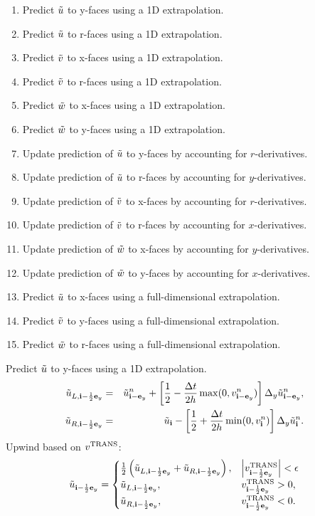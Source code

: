 \begin{enumerate}
\item Predict $\tilde{u}$ to y-faces using a 1D extrapolation.
\item Predict $\tilde{u}$ to r-faces using a 1D extrapolation.
\item Predict $\tilde{v}$ to x-faces using a 1D extrapolation.
\item Predict $\tilde{v}$ to r-faces using a 1D extrapolation.
\item Predict $\tilde{w}$ to x-faces using a 1D extrapolation.
\item Predict $\tilde{w}$ to y-faces using a 1D extrapolation.
\item Update prediction of $\tilde{u}$ to y-faces by accounting for $r$-derivatives.
\item Update prediction of $\tilde{u}$ to r-faces by accounting for $y$-derivatives.
\item Update prediction of $\tilde{v}$ to x-faces by accounting for $r$-derivatives.
\item Update prediction of $\tilde{v}$ to r-faces by accounting for $x$-derivatives.
\item Update prediction of $\tilde{w}$ to x-faces by accounting for $y$-derivatives.
\item Update prediction of $\tilde{w}$ to y-faces by accounting for $x$-derivatives.
\item Predict $\tilde{u}$ to x-faces using a full-dimensional extrapolation.
\item Predict $\tilde{v}$ to y-faces using a full-dimensional extrapolation.
\item Predict $\tilde{w}$ to r-faces using a full-dimensional extrapolation.
\end{enumerate}
Predict $\tilde{u}$ to y-faces using a 1D extrapolation.
\begin{eqnarray}
\tilde{u}_{L,{\bf i}-\frac{1}{2}{\bf e}_y} &=& \tilde{u}_{{\bf i}-{\bf e}_y}^n + \left[\frac{1}{2} - \frac{\Delta t}{2h}\max(0,v_{{\bf i}-{\bf e}_y}^n)\right]\Delta_y \tilde{u}_{{\bf i}-{\bf e}_y}^n, \\
\tilde{u}_{R,{\bf i}-\frac{1}{2}{\bf e}_y} &=& \tilde{u}_{{\bf i}} - \left[\frac{1}{2} + \frac{\Delta t}{2h}\min(0,v_{{\bf i}}^n)\right]\Delta_y \tilde{u}_{{\bf i}}^n.
\end{eqnarray}
Upwind based on $v^{\rm TRANS}$:
\begin{equation}
\tilde{u}_{{\bf i}-\frac{1}{2}{\bf e}_y} =
\begin{cases}
\frac{1}{2}\left(\tilde{u}_{L,{\bf i}-\frac{1}{2}{\bf e}_y} + \tilde{u}_{R,{\bf i}-\frac{1}{2}{\bf e}_y}\right), & \left|v^{\rm TRANS}_{{\bf i}-\frac{1}{2}{\bf e}_y}\right| < \epsilon \\
\tilde{u}_{L,{\bf i}-\frac{1}{2}{\bf e}_y}, & v^{\rm TRANS}_{{\bf i}-\frac{1}{2}{\bf e}_y} > 0, \\
\tilde{u}_{R,{\bf i}-\frac{1}{2}{\bf e}_y}, & v^{\rm TRANS}_{{\bf i}-\frac{1}{2}{\bf e}_y} < 0. \\
\end{cases}
\end{equation}
